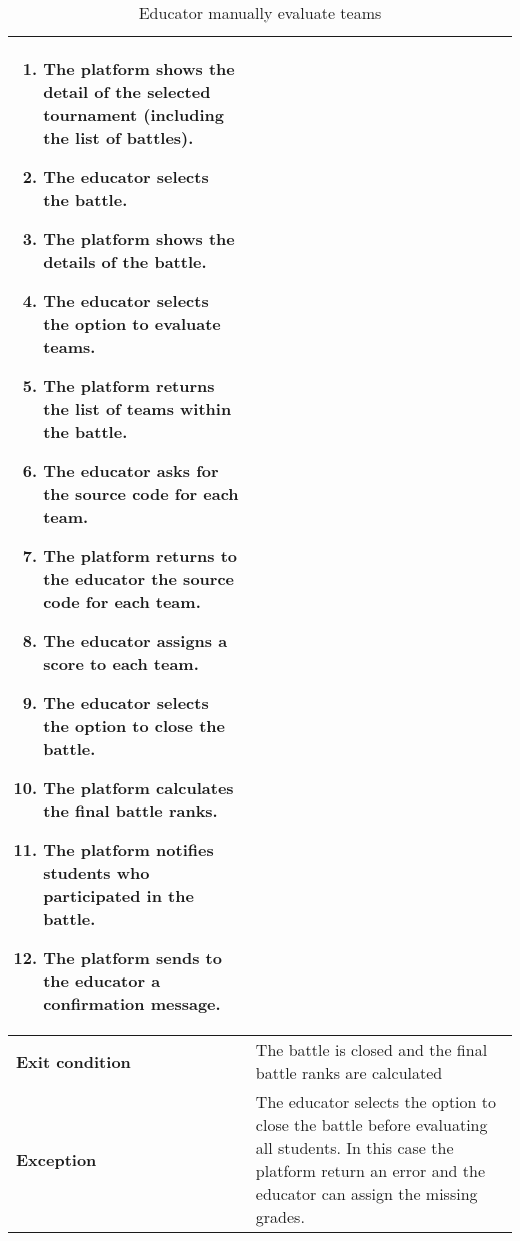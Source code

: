 \begin{enumerate}[label=\textbf{UC\arabic*}:,ref=UC\arabic*,leftmargin=1.3cm]
{\begin{table}[H]
\begin{tabular}{|l|p{11.9cm}|}
\begin{enumerate}[label=\arabic*.]
                              \item The platform shows the detail of the selected tournament (including the list of battles).
                              \item The educator selects the battle.
                              \item The platform shows the details of the battle.
                              \item The educator selects the option to evaluate teams.
                              \item The platform returns the list of teams within the battle.
                              \item The educator asks for the source code for each team.
                              \item The platform returns to the educator the source code for each team.
                              \item The educator assigns a score to each team.
                              \item The educator selects the option to close the battle.
                              \item The platform calculates the final battle ranks.
                              \item The platform notifies students who participated in the battle.
                              \item The platform sends to the educator a confirmation message.
                        \end{enumerate}                 \\\hline
                        \textbf{Exit condition}  & The battle is closed and the final battle ranks are calculated              \\\hline
                        \textbf{Exception}       & The educator selects the option to close the battle before evaluating all students.
                        In this case the platform return an error and the educator can assign the missing grades.              \\\hline
                  \end{tabular}
                  \caption{Educator manually evaluate teams    }
                  \label{table:Educator manually evaluate teams    }
            \end{table}
}
\end{enumerate}
